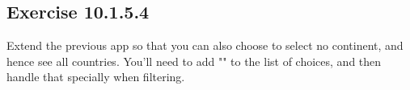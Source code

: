 \documentclass[]{book}
\newenvironment{Shaded}{\begin{snugshade}}{\end{snugshade}}
\newcommand{\DataTypeTok}[1]{\textcolor[rgb]{0.13,0.29,0.53}{#1}}
\newcommand{\KeywordTok}[1]{\textcolor[rgb]{0.13,0.29,0.53}{\textbf{#1}}}
\newcommand{\NormalTok}[1]{#1}
\newcommand{\OperatorTok}[1]{\textcolor[rgb]{0.81,0.36,0.00}{\textbf{#1}}}
\newcommand{\StringTok}[1]{\textcolor[rgb]{0.31,0.60,0.02}{#1}}
\begin{document}
\begin{solution}
\begin{Shaded}
\begin{Highlighting}[]
{{{{\NormalTok{  output}\OperatorTok{$}\NormalTok{data <-}\StringTok{ }\KeywordTok{renderTable}\NormalTok{(\{ }
    \KeywordTok{selected_data}\NormalTok{() }\OperatorTok{%
\StringTok{      }\KeywordTok{filter}\NormalTok{(country }\OperatorTok{==}\StringTok{ }\NormalTok{input}\OperatorTok{$}\NormalTok{country) }
\NormalTok{  \})}
\NormalTok{\}}

\KeywordTok{shinyApp}\NormalTok{(}\DataTypeTok{ui =}\NormalTok{ ui, }\DataTypeTok{server =}\NormalTok{ server)}
\end{Highlighting}
\end{Shaded}

\end{solution}

\hypertarget{exercise-10.1.5.4}{%
\subsection*{Exercise 10.1.5.4}\label{exercise-10.1.5.4}}

Extend the previous app so that you can also choose to select no continent, and hence see all countries. You'll need to add "" to the list of choices, and then handle that specially when filtering.
\end{document}
